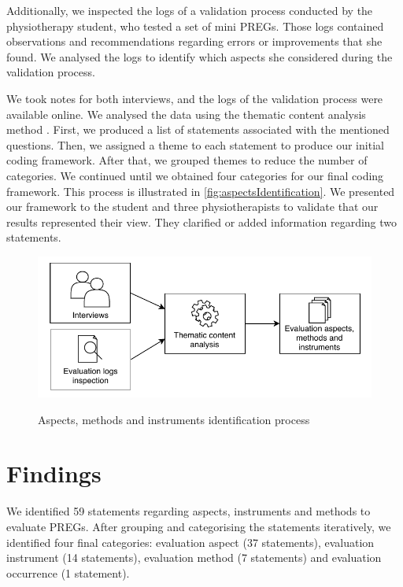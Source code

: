 Additionally, we inspected the logs of a validation process conducted by the physiotherapy student, who tested a set of mini \acp{PREG}. Those logs contained observations and recommendations regarding errors or improvements that she found. We analysed the logs to identify which aspects she considered during the validation process.

We took notes for both interviews, and the logs of the validation process were available online. We analysed the data using the thematic content analysis method \autocite{Burnard2008}. First, we produced a list of statements associated with the mentioned questions. Then, we assigned a theme to each statement to produce our initial coding framework. After that, we grouped themes to reduce the number of categories. We continued until we obtained four categories for our final coding framework. This process is illustrated in \autoref{fig:aspectsIdentification}. We presented our framework to the student and three physiotherapists to validate that our results represented their view. They clarified or added information regarding two statements.

\begin{figure}[htb]
\myfloatalign
{\includegraphics[width=\linewidth]{gfx/aspects/aspectsIdentification}} \quad
\caption{Aspects, methods and instruments identification process}\label{fig:aspectsIdentification}
\end{figure}

\section{Findings} %
\label{sec:findings_aspects}

We identified 59 statements regarding aspects, instruments and methods to evaluate \acp{PREG}. After grouping and categorising the statements iteratively, we identified four final categories: evaluation aspect (37 statements), evaluation instrument (14 statements), evaluation method (7 statements) and evaluation occurrence (1 statement).

